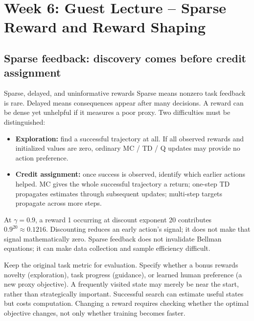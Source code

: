\documentclass[10pt,a4paper]{article}
\newcommand{\topic}[1]{\clearpage\section{#1}}
\begin{document}
\topic{Week 6: Guest Lecture -- Sparse Reward and Reward Shaping}


\subsection{Sparse feedback: discovery comes before credit assignment}
\begin{card}{Sparse, delayed, and uninformative rewards}
Sparse means nonzero task feedback is rare. Delayed means consequences appear after many decisions. A reward can be dense yet unhelpful if it measures a poor proxy. Two difficulties must be distinguished:
\begin{itemize}
\item \textbf{Exploration:} find a successful trajectory at all. If all observed rewards and initialized values are zero, ordinary MC / TD / Q updates may provide no action preference.
\item \textbf{Credit assignment:} once success is observed, identify which earlier actions helped. MC gives the whole successful trajectory a return; one-step TD propagates estimates through subsequent updates; multi-step targets propagate across more steps.
\end{itemize}
At $\gamma=0.9$, a reward 1 occurring at discount exponent 20 contributes $0.9^{20}\approx0.1216$. Discounting reduces an early action's signal; it does not make that signal mathematically zero. Sparse feedback does not invalidate Bellman equations; it can make data collection and sample efficiency difficult.
\end{card}
\begin{idea}
Keep the original task metric for evaluation. Specify whether a bonus rewards novelty (exploration), task progress (guidance), or learned human preference (a new proxy objective). A frequently visited state may merely be near the start, rather than strategically important. Successful search can estimate useful states but costs computation. Changing a reward requires checking whether the optimal objective changes, not only whether training becomes faster.
\end{idea}
\end{document}
